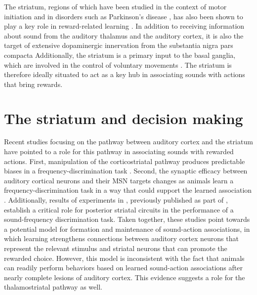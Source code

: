 The striatum, regions of which have been studied in the context of motor initiation \citep{Graybiel1994, Hikosaka2000a} and in disorders such as Parkinson's disease \citep{Huot2007, Kravitz2010, Parker2016}, has also been shown to play a key role in reward-related learning \citep{Wickens2003, Balleine2007}.
In addition to receiving information about sound from the auditory thalamus and the auditory cortex, it is also the target of extensive dopaminergic innervation from the substantia nigra pars compacta \citep{Menegas2015, Menegas2017}
Additionally, the striatum is a primary input to the basal ganglia, which are involved in the control of voluntary movements \citep{Smith1998, Kravitz2010}.
The striatum is therefore ideally situated to act as a key hub in associating sounds with actions that bring rewards.

\section{The striatum and decision making}
Recent studies focusing on the pathway between auditory cortex and the striatum have pointed to a role for this pathway in associating sounds with rewarded actions.
First, manipulation of the corticostriatal pathway produces predictable biases in a frequency-discrimination task \citep{Znamenskiy2013}.
Second, the synaptic efficacy between auditory cortical neurons and their MSN targets changes as animals learn a frequency-discrimination task in a way that could support the learned association \citep{Xiong2015}.
Additionally, results of experiments in \ch{\Musc}, previously published as part of \citet{Guo2018}, establish a critical role for posterior striatal circuits in the performance of a sound-frequency discrimination task. 
Taken together, these studies point towards a potential model for formation and maintenance of sound-action associations, in which learning strengthens connections between auditory cortex neurons that represent the relevant stimulus and striatal neurons that can promote the rewarded choice.
%
However, this model is inconsistent with the fact that animals can readily perform behaviors based on learned sound-action associations after nearly complete lesions of auditory cortex.
%
This evidence suggests a role for the thalamostriatal pathway as well.

